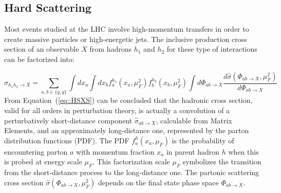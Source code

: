 \subsection{Hard Scattering} \label{sec::HardScattering}
Most events studied at the LHC involve high-momentum transfers in order to create massive particles or high-energetic jets. The inclusive production cross section of an observable $X$ from hadrons $h_1$ and $h_2$ for these type of interactions can be factorized into:

\begin{equation} \label{eq::HSXS}
 \sigma_{h_{1}h_{2} \rightarrow X} =\sum_{a,b \in \{q,g\} } \int dx_{a} \int dx_{b} f_{a}^{h_{1}}(x_{a},\mu^{2}_{F}) f_{b}^{h_{2}}(x_{b},\mu^{2}_{F}) \int d\Phi_{ab \rightarrow X} \dfrac{d\hat{\sigma}(\Phi_{ab \rightarrow X},\mu^{2}_{F})}{d\Phi_{ab \rightarrow X}}
\end{equation}
From Equation~(\ref{eq::HSXS}) can be concluded that the hadronic cross section, valid for all orders in perturbation theory, is actually a convolution of a perturbatively short-distance component $\hat{\sigma}_{ab \rightarrow X}$, calculable from Matrix Elements, and an approximately long-distance one, represented by the parton distribution functions (PDF). The PDF $f_{a}^{h}(x_{a},\mu_{F})$ is the probability of encountering parton $a$ with momentum fraction $x_a$ in parent hadron $h$ when this is probed at energy scale $\mu_{F}$. This factorization scale $\mu_{F}$ symbolizes the transition from the short-distance process to the long-distance one. 
The partonic scattering cross section $\hat{\sigma}(\Phi_{ab \rightarrow X},\mu^{2}_{F})$ depends on the final state phase space $\Phi_{ab \rightarrow X}$. 

